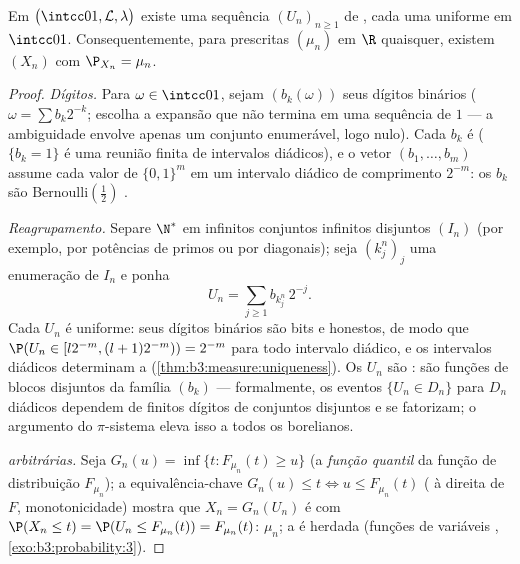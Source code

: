 \begin{theorem}
\label{thm:b3:probability:existence}
Em $\bigl(\intcc01, \mathcal L, \lambda\bigr)$ existe uma sequência $(U_n)_{n\geq1}$ de 
, cada uma uniforme em $\intcc01$. Consequentemente, para 
prescritas $(\mu_n)$ em $\R$ quaisquer, existem $(X_n)$ 
com $\P_{X_n} = \mu_n$.
\end{theorem}

\begin{proof}
\emph{Dígitos.} Para $\omega \in \intcc01$, sejam $(b_k(\omega))$ seus dígitos binários ($\omega = \sum b_k2^{-k}$;
escolha a expansão que não termina em uma sequência de $1$ --- a
ambiguidade envolve apenas um conjunto enumerável, logo nulo). Cada
$b_k$ é  ($\{b_k = 1\}$ é uma reunião finita de intervalos
diádicos), e o vetor $(b_1, \dots, b_m)$ assume cada valor de $\{0,1\}^m$ em um intervalo
diádico de comprimento $2^{-m}$: os $b_k$ são Bernoulli$(\frac12)$
.

\emph{Reagrupamento.} Separe $\N^*$ em infinitos conjuntos infinitos
disjuntos $(I_n)$ (por exemplo, por potências de primos ou por
diagonais); seja $(k^n_j)_j$ uma enumeração de $I_n$ e ponha
\[
U_n = \sum_{j\geq1} b_{k^n_j}\,2^{-j} .
\]
Cada $U_n$ é uniforme: seus dígitos binários são bits  e
honestos, de modo que $\P(U_n \in [l2^{-m}, (l+1)2^{-m})) = 2^{-m}$ para todo intervalo diádico, e os intervalos
diádicos determinam a  (\cref{thm:b3:measure:uniqueness}). Os $U_n$ são
: são funções de blocos disjuntos da família 
$(b_k)$ --- formalmente, os eventos $\{U_n \in D_n\}$ para $D_n$ diádicos
dependem de finitos dígitos de conjuntos disjuntos e se fatorizam; o
argumento do $\pi$-sistema eleva isso a todos os borelianos.

\emph{ arbitrárias.} Seja $G_n(u) = \inf\{t : F_{\mu_n}(t)
\geq u\}$ (a \emph{função quantil} da função
de distribuição $F_{\mu_n}$); a equivalência-chave $G_n(u) \leq t
\iff u \leq F_{\mu_n}(t)$ ( à
direita de $F$, monotonicidade) mostra que $X_n = G_n(U_n)$ é  com
$\P(X_n \leq t) = \P(U_n \leq F_{\mu_n}(t)) =
F_{\mu_n}(t)$:  $\mu_n$; a  é herdada (funções de variáveis
, \cref{exo:b3:probability:3}).
\end{proof}

